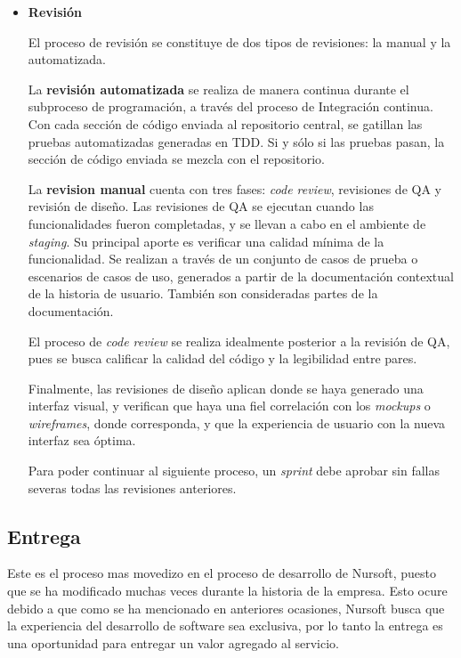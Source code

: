 \begin{itemize}
  \item \textbf{Revisión}
  
  El proceso de revisión se constituye de dos tipos de revisiones: la manual y la automatizada.

  La \textbf{revisión automatizada} se realiza de manera continua durante el subproceso de programación, a través del proceso de Integración continua.
  Con cada sección de código enviada al repositorio central, se gatillan las pruebas automatizadas generadas en TDD. Si y sólo si las
  pruebas pasan, la sección de código enviada se mezcla con el repositorio.

  La \textbf{revision manual} cuenta con tres fases: \textit{code review}, revisiones de QA y revisión de diseño. Las revisiones de QA
  se ejecutan cuando las funcionalidades fueron completadas, y se llevan a cabo en el ambiente de \textit{staging}. 
  Su principal aporte es verificar una calidad mínima de la funcionalidad. Se realizan a través de un conjunto de casos de prueba o
  escenarios de casos de uso, generados a partir de la documentación contextual de la historia de usuario. También son consideradas partes de la documentación.

  El proceso de \textit{code review} se realiza idealmente posterior a la revisión de QA, pues se busca calificar la calidad
  del código y la legibilidad entre pares.

  Finalmente, las revisiones de diseño aplican donde se haya generado una interfaz visual, y verifican que haya una fiel correlación
  con los \textit{mockups} o \textit{wireframes}, donde corresponda, y que la experiencia de usuario con la nueva interfaz sea óptima.

  Para poder continuar al siguiente proceso, un \textit{sprint} debe aprobar sin fallas severas todas las revisiones anteriores.

\end{itemize}

\subsection{Entrega}

Este es el proceso mas movedizo en el proceso de desarrollo de Nursoft, puesto que se ha modificado muchas veces durante la historia
de la empresa. Esto ocure debido a que como se ha mencionado en anteriores ocasiones, Nursoft busca que la experiencia del
desarrollo de software sea exclusiva, por lo tanto la entrega es una oportunidad para entregar un valor agregado al servicio.

